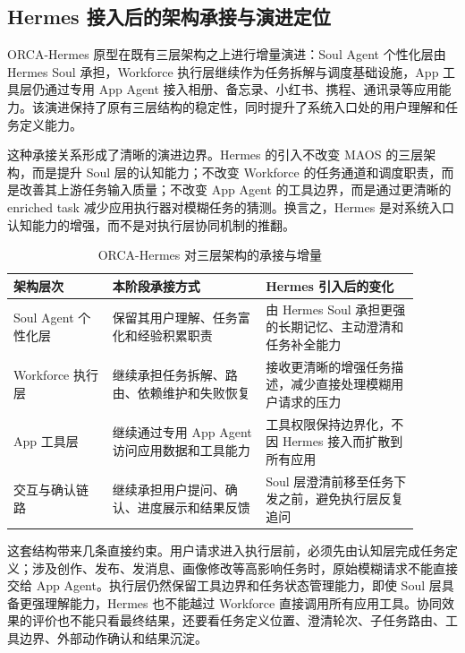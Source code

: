 \subsection{Hermes 接入后的架构承接与演进定位}

ORCA-Hermes 原型在既有三层架构之上进行增量演进：Soul Agent 个性化层由 Hermes Soul 承担，Workforce 执行层继续作为任务拆解与调度基础设施，App 工具层仍通过专用 App Agent 接入相册、备忘录、小红书、携程、通讯录等应用能力。该演进保持了原有三层结构的稳定性，同时提升了系统入口处的用户理解和任务定义能力。

这种承接关系形成了清晰的演进边界。Hermes 的引入不改变 MAOS 的三层架构，而是提升 Soul 层的认知能力；不改变 Workforce 的任务通道和调度职责，而是改善其上游任务输入质量；不改变 App Agent 的工具边界，而是通过更清晰的 enriched task 减少应用执行器对模糊任务的猜测。换言之，Hermes 是对系统入口认知能力的增强，而不是对执行层协同机制的推翻。

\begin{table}[h]
\centering
\begin{tabular}{p{0.22\linewidth}p{0.34\linewidth}p{0.34\linewidth}}
\hline
\textbf{架构层次} & \textbf{本阶段承接方式} & \textbf{Hermes 引入后的变化} \\
\hline
Soul Agent 个性化层 & 保留其用户理解、任务富化和经验积累职责 & 由 Hermes Soul 承担更强的长期记忆、主动澄清和任务补全能力 \\
Workforce 执行层 & 继续承担任务拆解、路由、依赖维护和失败恢复 & 接收更清晰的增强任务描述，减少直接处理模糊用户请求的压力 \\
App 工具层 & 继续通过专用 App Agent 访问应用数据和工具能力 & 工具权限保持边界化，不因 Hermes 接入而扩散到所有应用 \\
交互与确认链路 & 继续承担用户提问、确认、进度展示和结果反馈 & Soul 层澄清前移至任务下发之前，避免执行层反复追问 \\
\hline
\end{tabular}
\caption{ORCA-Hermes 对三层架构的承接与增量}
\label{tab:rt3-architecture-evolution}
\end{table}

这套结构带来几条直接约束。用户请求进入执行层前，必须先由认知层完成任务定义；涉及创作、发布、发消息、画像修改等高影响任务时，原始模糊请求不能直接交给 App Agent。执行层仍然保留工具边界和任务状态管理能力，即使 Soul 层具备更强理解能力，Hermes 也不能越过 Workforce 直接调用所有应用工具。协同效果的评价也不能只看最终结果，还要看任务定义位置、澄清轮次、子任务路由、工具边界、外部动作确认和结果沉淀。

